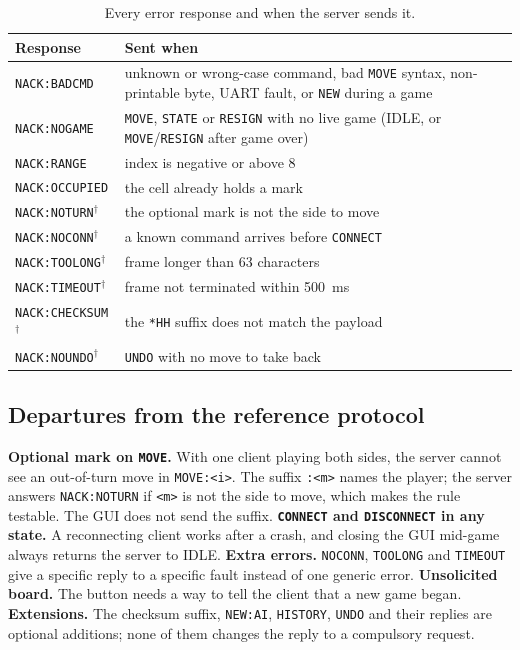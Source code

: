 \begin{table}[t]
\centering
\caption{Every error response and when the server sends it.}
\label{tab:errors}
\footnotesize
\begin{tabular}{@{}L{2.5cm}L{5.5cm}@{}}
\toprule
Response & Sent when \\
\midrule
\texttt{NACK:BADCMD} & unknown or wrong-case command, bad \texttt{MOVE} syntax, non-printable byte, UART fault, or \texttt{NEW} during a game \\
\texttt{NACK:NOGAME} & \texttt{MOVE}, \texttt{STATE} or \texttt{RESIGN} with no live game (IDLE, or \texttt{MOVE}/\texttt{RESIGN} after game over) \\
\texttt{NACK:RANGE} & index is negative or above 8 \\
\texttt{NACK:OCCUPIED} & the cell already holds a mark \\
\texttt{NACK:NOTURN}$^\dagger$ & the optional mark is not the side to move \\
\texttt{NACK:NOCONN}$^\dagger$ & a known command arrives before \texttt{CONNECT} \\
\texttt{NACK:TOOLONG}$^\dagger$ & frame longer than 63 characters \\
\texttt{NACK:TIMEOUT}$^\dagger$ & frame not terminated within 500~ms \\
\texttt{NACK:CHECKSUM}$^\dagger$ & the \texttt{*HH} suffix does not match the payload \\
\texttt{NACK:NOUNDO}$^\dagger$ & \texttt{UNDO} with no move to take back \\
\bottomrule
\end{tabular}
\end{table}

\subsection{Departures from the reference protocol}
\textbf{Optional mark on \texttt{MOVE}.} With one client playing both sides,
the server cannot see an out-of-turn move in \texttt{MOVE:<i>}. The suffix
\texttt{:<m>} names the player; the server answers \texttt{NACK:NOTURN} if
\texttt{<m>} is not the side to move, which makes the rule testable. The GUI
does not send the suffix. \textbf{\texttt{CONNECT} and \texttt{DISCONNECT} in
any state.} A reconnecting client works after a crash, and closing the GUI
mid-game always returns the server to IDLE. \textbf{Extra errors.}
\texttt{NOCONN}, \texttt{TOOLONG} and \texttt{TIMEOUT} give a specific reply
to a specific fault instead of one generic error. \textbf{Unsolicited board.}
The button needs a way to tell the client that a new game began.
\textbf{Extensions.} The checksum suffix, \texttt{NEW:AI}, \texttt{HISTORY},
\texttt{UNDO} and their replies are optional additions; none of them changes the
reply to a compulsory request.

